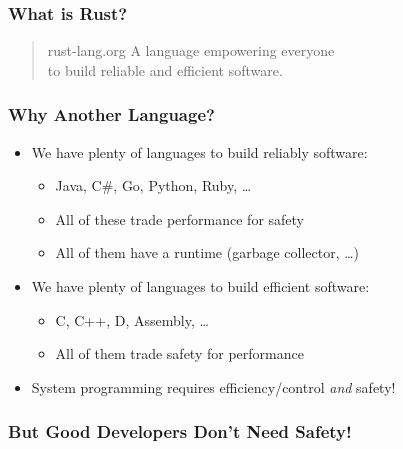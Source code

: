 \begin{frame}
    \frametitle{What is Rust?}

    \begin{quote}{rust-lang.org}
    \centering
        A language empowering everyone\\
        to build reliable and efficient software.
    \end{quote}
\end{frame}

\begin{frame}
    \frametitle{Why Another Language?}

    \begin{itemize}
        \item We have plenty of languages to build reliably software:
        \begin{itemize}
            \item Java, C\#, Go, Python, Ruby, \dots
            \item All of these trade performance for safety
            \item All of them have a runtime (garbage collector, \dots)
        \end{itemize}

        \pause

        \item We have plenty of languages to build efficient software:
        \begin{itemize}
            \item C, C++, D, Assembly, \dots
            \item All of them trade safety for performance
        \end{itemize}

        \pause

        \item System programming requires efficiency/control \emph{and} safety!
    \end{itemize}
\end{frame}

\begin{frame}
    \frametitle{But Good Developers Don't Need Safety!}

    \pause

\end{frame}

